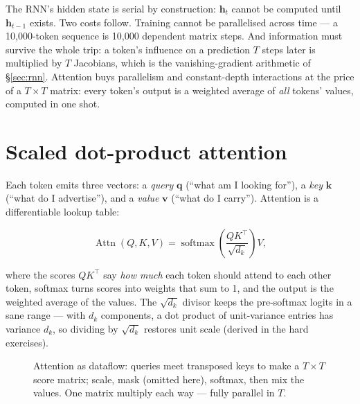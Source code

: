 The RNN's hidden state is serial by construction: $\mathbf h_t$
cannot be computed until $\mathbf h_{t-1}$ exists. Two costs follow.
Training cannot be parallelised across time --- a 10{,}000-token
sequence is 10{,}000 dependent matrix steps. And information must
survive the whole trip: a token's influence on a prediction $T$ steps
later is multiplied by $T$ Jacobians, which is the vanishing-gradient
arithmetic of \S\ref{sec:rnn}. Attention buys parallelism and
constant-depth interactions at the price of a $T\times T$ matrix:
every token's output is a weighted average of \emph{all} tokens'
values, computed in one shot.

\section{Scaled dot-product attention}
\label{sec:sdpa}

Each token emits three vectors: a \emph{query} $\mathbf q$ (``what am
I looking for''), a \emph{key} $\mathbf k$ (``what do I advertise''),
and a \emph{value} $\mathbf v$ (``what do I carry''). Attention is a
differentiable lookup table:

\begin{equation*}
\operatorname{Attn}(Q,K,V) =
\operatorname{softmax}\!\left(\frac{QK^{\top}}{\sqrt{d_k}}\right)V,
\end{equation*}

where the scores $QK^\top$ say \emph{how much} each token should
attend to each other token, softmax turns scores into weights that
sum to 1, and the output is the weighted average of the values. The
$\sqrt{d_k}$ divisor keeps the pre-softmax logits in a sane range ---
with $d_k$ components, a dot product of unit-variance entries has
variance $d_k$, so dividing by $\sqrt{d_k}$ restores unit scale
(derived in the hard exercises).

\begin{figure}[htbp]
\centering
{}
\caption{Attention as dataflow: queries meet transposed keys to make
a $T\times T$ score matrix; scale, mask (omitted here), softmax, then
mix the values. One matrix multiply each way --- fully parallel in
$T$.}
\label{fig:dataflow}
\end{figure}

